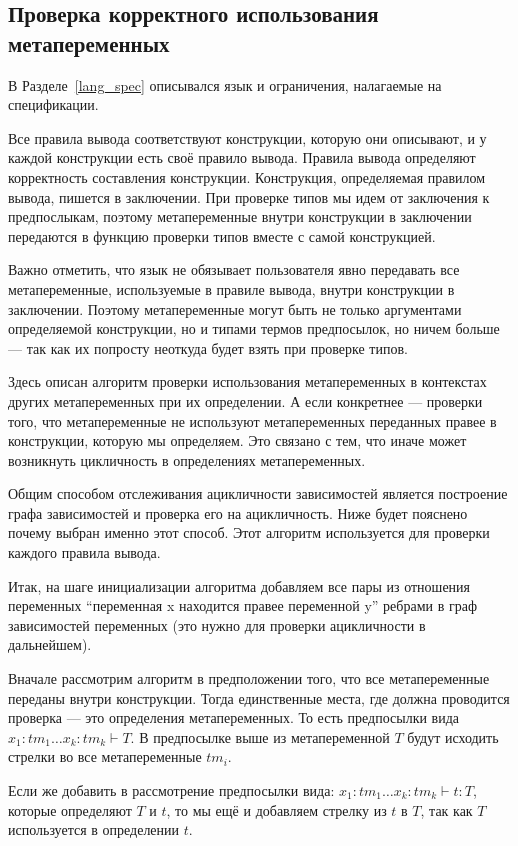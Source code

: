 \subsection{Проверка корректного использования метапеременных}\label{toposort}
В Разделе~\ref{lang_spec} описывался язык и ограничения, налагаемые на спецификации.

Все правила вывода соответствуют конструкции, которую они описывают, и у каждой конструкции есть своё правило вывода. Правила вывода определяют корректность составления конструкции. Конструкция, определяемая правилом вывода, пишется в заключении. При проверке типов мы идем от заключения к предпослыкам, поэтому метапеременные внутри конструкции в заключении передаются в функцию проверки типов вместе с самой конструкцией.

Важно отметить, что язык не обязывает пользователя явно передавать все метапеременные, используемые в правиле вывода, внутри конструкции в заключении. Поэтому метапеременные могут быть не только аргументами определяемой конструкции, но и типами термов предпосылок, но ничем больше --- так как их попросту неоткуда будет взять при проверке типов.

Здесь описан алгоритм проверки использования метапеременных в контекстах других метапеременных при их определении. А если конкретнее --- проверки того, что метапеременные не используют метапеременных переданных правее в конструкции, которую мы определяем. Это связано с тем, что иначе может возникнуть цикличность в определениях метапеременных.

Общим способом отслеживания ацикличности зависимостей является построение графа зависимостей и проверка его на ацикличность. Ниже будет пояснено почему выбран именно этот способ. Этот алгоритм используется для проверки каждого правила вывода.

Итак, на шаге инициализации алгоритма добавляем все пары из отношения переменных ``переменная x находится правее переменной y'' ребрами в граф зависимостей переменных (это нужно для проверки ацикличности в дальнейшем).

Вначале рассмотрим алгоритм в предположении того, что все метапеременные переданы внутри конструкции.
Тогда единственные места, где должна проводится проверка --- это определения метапеременных. То есть предпосылки вида $x_1 : tm_1 \ldots x_k : tm_k  \vdash T$. В предпосылке выше из метапеременной $T$ будут исходить стрелки во все метапеременные $tm_i$.

Если же добавить в рассмотрение предпосылки вида: $x_1 : tm_1 \ldots x_k : tm_k  \vdash t : T$, которые определяют $T$ и $t$, то мы ещё и добавляем стрелку из $t$ в $T$, так как $T$ используется в определении $t$.

